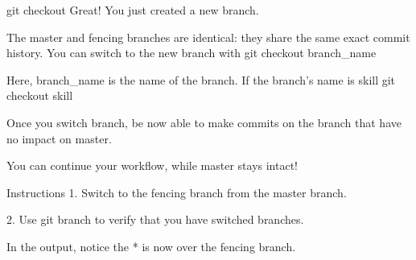 git checkout
    Great! You just created a new branch.

    The master and fencing branches are identical: they share the same exact commit history. You can switch to the new branch with
        git checkout branch_name
    
    Here, branch_name is the name of the branch. If the branch’s name is skill
        git checkout skill
    
    Once you switch branch, be now able to make commits on the branch that have no impact on master.

    You can continue your workflow, while master stays intact!

Instructions
    1.
    Switch to the fencing branch from the master branch.

    2.
    Use git branch to verify that you have switched branches.

    In the output, notice the * is now over the fencing branch.